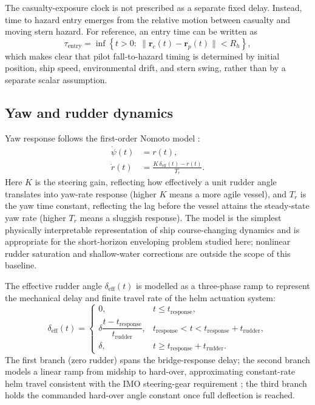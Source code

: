 \documentclass[preprint,12pt]{elsarticle}
\begin{document}
The casualty-exposure clock is not prescribed as a separate fixed delay. Instead, time to hazard entry emerges from the relative motion between casualty and moving stern hazard. For reference, an entry time can be written as
\begin{equation}
\tau_{\mathrm{entry}} = \inf\left\{t>0:\ \|\mathbf{r}_c(t)-\mathbf{r}_p(t)\| < R_h\right\},
\end{equation}
which makes clear that pilot fall-to-hazard timing is determined by initial position, ship speed, environmental drift, and stern swing, rather than by a separate scalar assumption.

\subsection{Yaw and rudder dynamics}
Yaw response follows the first-order Nomoto model \cite{ref_fossen}:
\begin{align}
\dot{\psi}(t) &= r(t),\\
\dot{r}(t) &= \frac{K\,\delta_{\mathrm{eff}}(t)-r(t)}{T_r}.
\end{align}
Here $K$ is the steering gain, reflecting how effectively a unit rudder angle translates into yaw-rate response (higher $K$ means a more agile vessel), and $T_r$ is the yaw time constant, reflecting the lag before the vessel attains the steady-state yaw rate (higher $T_r$ means a sluggish response). The model is the simplest physically interpretable representation of ship course-changing dynamics and is appropriate for the short-horizon enveloping problem studied here; nonlinear rudder saturation and shallow-water corrections are outside the scope of this baseline.

The effective rudder angle $\delta_{\mathrm{eff}}(t)$ is modelled as a three-phase ramp to represent the mechanical delay and finite travel rate of the helm actuation system:
\begin{equation}
\delta_{\mathrm{eff}}(t)=
\begin{cases}
0, & t\le t_{\mathrm{response}},\\
\delta\dfrac{t-t_{\mathrm{response}}}{t_{\mathrm{rudder}}}, & t_{\mathrm{response}}<t<t_{\mathrm{response}}+t_{\mathrm{rudder}},\\
\delta, & t\ge t_{\mathrm{response}}+t_{\mathrm{rudder}}.
\end{cases}
\end{equation}
The first branch (zero rudder) spans the bridge-response delay; the second branch models a linear ramp from midship to hard-over, approximating constant-rate helm travel consistent with the IMO steering-gear requirement \cite{ref_solas}; the third branch holds the commanded hard-over angle constant once full deflection is reached.
\end{document}
